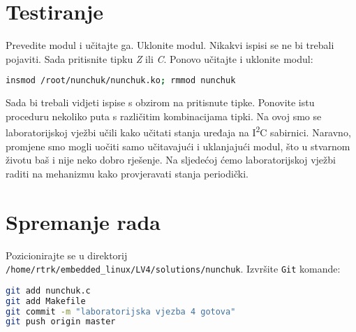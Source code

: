 \documentclass[11pt]{article}
\begin{document}
\section{Testiranje}
Prevedite modul i učitajte ga. Uklonite modul. Nikakvi ispisi se ne bi trebali
pojaviti. Sada pritisnite tipku \textit{Z} ili \textit{C}. Ponovo učitajte i
uklonite modul:
\begin{lstlisting}[language=bash]
insmod /root/nunchuk/nunchuk.ko; rmmod nunchuk
\end{lstlisting}
Sada bi trebali vidjeti ispise s obzirom na pritisnute tipke. Ponovite istu
proceduru nekoliko puta s različitim kombinacijama tipki.
\newline
\newline
Na ovoj smo se laboratorijskoj vježbi učili kako učitati stanja uređaja na
I\textsuperscript{2}C sabirnici. Naravno, promjene smo mogli uočiti samo
učitavajući i uklanjajući modul, što u stvarnom životu baš i nije neko dobro
rješenje. Na sljedećoj ćemo laboratorijskoj vježbi raditi na mehanizmu kako
provjeravati stanja periodički.

\section{Spremanje rada}
Pozicionirajte se u direktorij \texttt{/home/rtrk/embedded\_linux/LV4/solutions/nunchuk}.
Izvršite \texttt{Git} komande:
\begin{lstlisting}[language=bash]
git add nunchuk.c
git add Makefile
git commit -m "laboratorijska vjezba 4 gotova"
git push origin master
\end{lstlisting}
\end{document}
